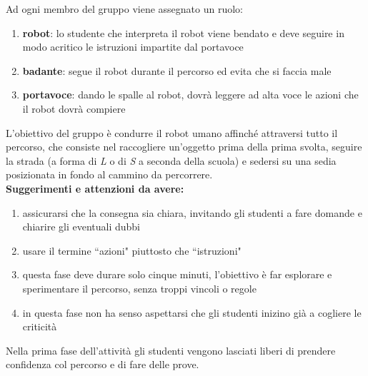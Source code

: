 \documentclass[12pt]{article}
\begin{document}
Ad ogni membro del gruppo viene assegnato un ruolo:

\begin{enumerate}
\item \textbf{robot}: lo studente che interpreta il robot viene bendato e deve seguire in modo acritico le istruzioni impartite dal portavoce
\item \textbf{badante}: segue il robot durante il percorso ed evita che si faccia male
\item \textbf{portavoce}: dando le spalle al robot, dovrà leggere ad alta voce le azioni che il robot dovrà compiere
\end{enumerate}

L'obiettivo del gruppo è condurre il robot umano affinché attraversi tutto il percorso, che consiste nel raccogliere un'oggetto prima della prima svolta, seguire la strada (a forma di \textit{L} o di \textit{S} a seconda della scuola) e sedersi su una sedia posizionata in fondo al cammino da percorrere.\\

\textbf{Suggerimenti e attenzioni da avere:}
\begin{enumerate}
\item assicurarsi che la consegna sia chiara, invitando gli studenti a fare domande e chiarire gli eventuali dubbi
\item usare il termine ``azioni" piuttosto che ``istruzioni"
\item questa fase deve durare solo cinque minuti, l'obiettivo è far esplorare e sperimentare il percorso, senza troppi vincoli o regole
\item in questa fase non ha senso aspettarsi che gli studenti inizino già a cogliere le criticità
\end{enumerate}

Nella prima fase dell'attività gli studenti vengono lasciati liberi di prendere confidenza col percorso e di fare delle prove.\\
\end{document}
